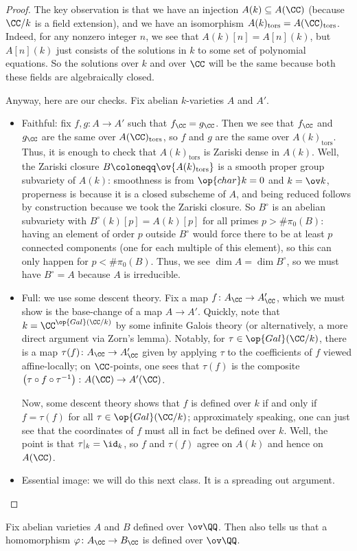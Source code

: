 \documentclass[../notes.tex]{subfiles}
\begin{document}
\begin{proof}
	The key observation is that we have an injection $A(k)\subseteq A(\CC)$ (because $\CC/k$ is a field extension), and we have an isomorphism $A(k)_{\mathrm{tors}}=A(\CC)_{\mathrm{tors}}$. Indeed, for any nonzero integer $n$, we see that $A(k)[n]=A[n](k)$, but $A[n](k)$ just consists of the solutions in $k$ to some set of polynomial equations. So the solutions over $k$ and over $\CC$ will be the same because both these fields are algebraically closed.

	Anyway, here are our checks. Fix abelian $k$-varieties $A$ and $A'$.
	\begin{itemize}
		\item Faithful: fix $f,g\colon A\to A'$ such that $f_\CC=g_\CC$. Then we see that $f_\CC$ and $g_\CC$ are the same over $A(\CC)_{\mathrm{tors}}$, so $f$ and $g$ are the same over $A(k)_{\mathrm{tors}}$. Thus, it is enough to check that $A(k)_{\mathrm{tors}}$ is Zariski dense in $A(k)$. Well, the Zariski closure $B\coloneqq\ov{A(k)_{\mathrm{tors}}}$ is a smooth proper group subvariety of $A(k)$: smoothness is from $\op{char}k=0$ and $k=\ov k$, properness is because it is a closed subscheme of $A$, and being reduced follows by construction because we took the Zariski closure. So $B^\circ$ is an abelian subvariety with $B^\circ(k)[p]=A(k)[p]$ for all primes $p>\#\pi_0(B)$: having an element of order $p$ outside $B^\circ$ would force there to be at least $p$ connected components (one for each multiple of this element), so this can only happen for $p<\#\pi_0(B)$. Thus, we see $\dim A=\dim B^\circ$, so we must have $B^\circ=A$ because $A$ is irreducible.

		\item Full: we use some descent theory. Fix a map $f\colon A_\CC\to A'_\CC$, which we must show is the base-change of a map $A\to A'$. Quickly, note that $k=\CC^{\op{Gal}(\CC/k)}$ by some infinite Galois theory (or alternatively, a more direct argument via Zorn's lemma). Notably, for $\tau\in\op{Gal}(\CC/k)$, there is a map $\tau(f)\colon A_\CC\to A'_\CC$ given by applying $\tau$ to the coefficients of $f$ viewed affine-locally; on $\CC$-points, one sees that $\tau(f)$ is the composite $\left(\tau\circ f\circ\tau^{-1}\right)\colon A(\CC)\to A'(\CC)$.

		Now, some descent theory shows that $f$ is defined over $k$ if and only if $f=\tau(f)$ for all $\tau\in\op{Gal}(\CC/k)$; approximately speaking, one can just see that the coordinates of $f$ must all in fact be defined over $k$. Well, the point is that $\tau|_k=\id_k$, so $f$ and $\tau(f)$ agree on $A(k)$ and hence on $A(\CC)$.

		\item Essential image: we will do this next class. It is a spreading out argument.
		\qedhere
	\end{itemize}
\end{proof}
\begin{remark}
	Fix abelian varieties $A$ and $B$ defined over $\ov\QQ$. Then  also tells us that a homomorphism $\varphi\colon A_\CC\to B_\CC$ is defined over $\ov\QQ$.
\end{remark}
\end{document}
